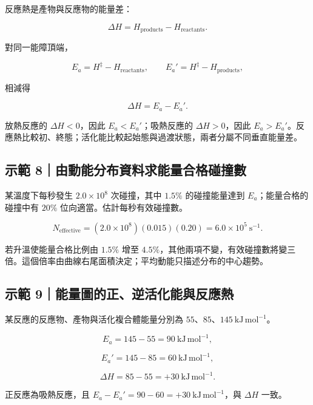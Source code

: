 \documentclass[11pt,a4paper]{article}
\begin{document}
反應熱是產物與反應物的能量差：

\[
\Delta H=H_{\mathrm{products}}-H_{\mathrm{reactants}}.
\]

對同一能障頂端，

\[
E_a=H^{\ddagger}-H_{\mathrm{reactants}},
\qquad
E_a'=H^{\ddagger}-H_{\mathrm{products}},
\]

相減得

\[
\boxed{\Delta H=E_a-E_a'}.
\]

放熱反應的 \(\Delta H<0\)，因此 \(E_a<E_a'\)；吸熱反應的 \(\Delta H>0\)，因此 \(E_a>E_a'\)。反應熱比較初、終態；活化能比較起始態與過渡狀態，兩者分屬不同垂直能量差。

\begin{HandoutWorkedExample}

\subsection{示範 8｜由動能分布資料求能量合格碰撞數}\label{ux793aux7bc4-8ux7531ux52d5ux80fdux5206ux5e03ux8cc7ux6599ux6c42ux80fdux91cfux5408ux683cux78b0ux649eux6578}

某溫度下每秒發生 \(2.0\times10^8\) 次碰撞，其中 \(1.5\%\) 的碰撞能量達到 \(E_a\)；能量合格的碰撞中有 \(20\%\) 位向適當。估計每秒有效碰撞數。

\[
N_{\mathrm{effective}}
=(2.0\times10^8)(0.015)(0.20)
=6.0\times10^5\ \mathrm{s^{-1}}.
\]

若升溫使能量合格比例由 \(1.5\%\) 增至 \(4.5\%\)，其他兩項不變，有效碰撞數將變三倍。這個倍率由曲線右尾面積決定；平均動能只描述分布的中心趨勢。

\end{HandoutWorkedExample}

\begin{HandoutWorkedExample}

\subsection{示範 9｜能量圖的正、逆活化能與反應熱}\label{ux793aux7bc4-9ux80fdux91cfux5716ux7684ux6b63ux9006ux6d3bux5316ux80fdux8207ux53cdux61c9ux71b1}

某反應的反應物、產物與活化複合體能量分別為 \(55\)、\(85\)、\(145\ \mathrm{kJ\,mol^{-1}}\)。

\[
E_a=145-55=90\ \mathrm{kJ\,mol^{-1}},
\]

\[
E_a'=145-85=60\ \mathrm{kJ\,mol^{-1}},
\]

\[
\Delta H=85-55=+30\ \mathrm{kJ\,mol^{-1}}.
\]

正反應為吸熱反應，且 \(E_a-E_a'=90-60=+30\ \mathrm{kJ\,mol^{-1}}\)，與 \(\Delta H\) 一致。

\end{HandoutWorkedExample}
\end{document}
